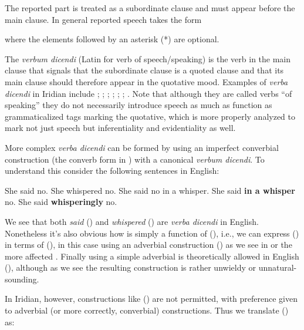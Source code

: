 The reported part is treated as a subordinate clause and must appear before the main clause. In general reported speech takes the form

\ex{}\xe

where the elements followed by an asterisk (*) are optional.

The \emph{verbum dicendi} (Latin for verb of speech/speaking) is the verb in the main clause that signals that the subordinate clause is a quoted clause and that its main clause should therefore appear in the quotative mood. Examples of \emph{verba dicendi} in Iridian include ; ; ; ; ; ; . Note that although they are called verbs ``of speaking'' they do not necessarily introduce speech as much as function as grammaticalized tags marking the quotative,  which is more properly analyzed to mark not just speech but inferentiality and evidentiality as well.

More complex \emph{verba dicendi} can be formed by using an imperfect converbial construction (the converb form in ) with a canonical \emph{verbum dicendi}. To understand this consider the following sentences in English:

\pex[*=?*]
\a She said no.
\a She whispered no.
\a She said no in a whisper.
\a {} She said \textbf{in a whisper} no.
\a {} She said \textbf{whisperingly} no.
\xe

\smallskip

We see that both \emph{said} () and \emph{whispered} () are \emph{verba dicendi} in English. Nonetheless it's also obvious how  is simply a function of (), i.e., we can express () in terms of (), in this case using an adverbial construction () as we see in  or the more affected . Finally using a simple adverbial is theoretically allowed in English (), although as we see the resulting construction is rather unwieldy or unnatural-sounding.

In Iridian, however, constructions like () are not permitted, with preference given to adverbial (or more correctly, converbial) constructions. Thus we translate () as:

